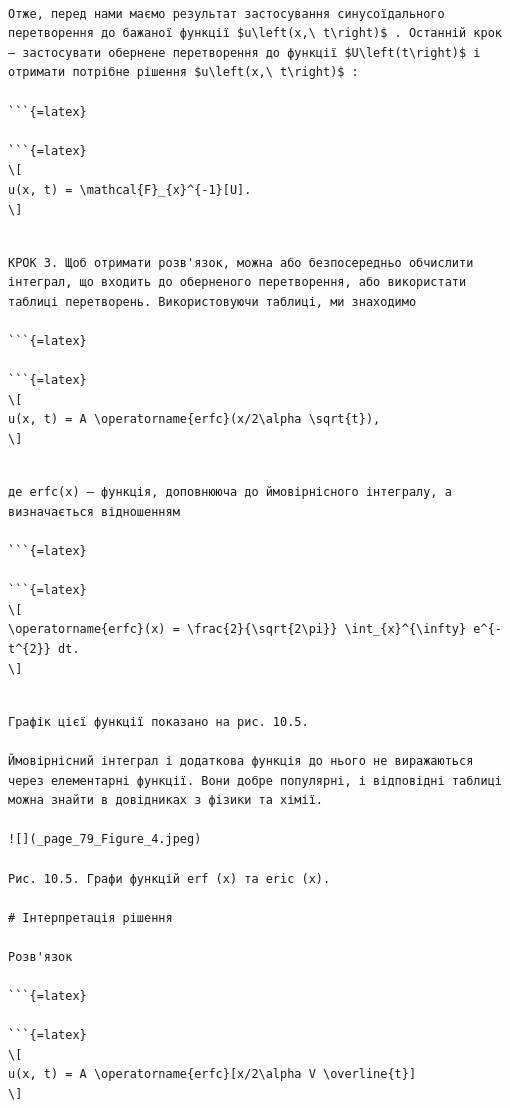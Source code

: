 \documentclass[
]{article}
\begin{document}
\begin{verbatim}

Отже, перед нами маємо результат застосування синусоїдального перетворення до бажаної функції $u\left(x,\ t\right)$ . Останній крок — застосувати обернене перетворення до функції $U\left(t\right)$ і отримати потрібне рішення $u\left(x,\ t\right)$ :

```{=latex}

```{=latex}
\[
u(x, t) = \mathcal{F}_{x}^{-1}[U].
\]
\end{verbatim}

\begin{verbatim}

КРОК 3. Щоб отримати розв'язок, можна або безпосередньо обчислити інтеграл, що входить до оберненого перетворення, або використати таблиці перетворень. Використовуючи таблиці, ми знаходимо

```{=latex}

```{=latex}
\[
u(x, t) = A \operatorname{erfc}(x/2\alpha \sqrt{t}),
\]
\end{verbatim}

\begin{verbatim}

де erfc(x) — функція, доповнююча до ймовірнісного інтегралу, а визначається відношенням

```{=latex}

```{=latex}
\[
\operatorname{erfc}(x) = \frac{2}{\sqrt{2\pi}} \int_{x}^{\infty} e^{-t^{2}} dt.
\]
\end{verbatim}

\begin{verbatim}

Графік цієї функції показано на рис. 10.5.

Ймовірнісний інтеграл і додаткова функція до нього не виражаються через елементарні функції. Вони добре популярні, і відповідні таблиці можна знайти в довідниках з фізики та хімії.

![](_page_79_Figure_4.jpeg)

Рис. 10.5. Графи функцій erf (x) та eric (x).

# Інтерпретація рішення

Розв'язок

```{=latex}

```{=latex}
\[
u(x, t) = A \operatorname{erfc}[x/2\alpha V \overline{t}]
\]
\end{verbatim}
\end{document}
